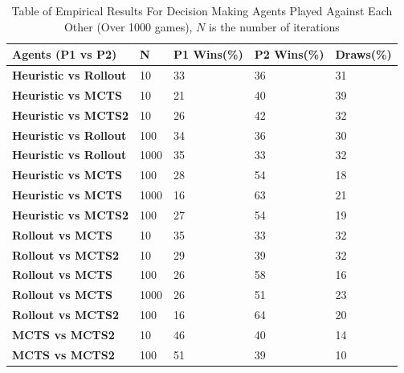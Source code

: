 \documentclass[journal]{IEEEtran}
\begin{document}
\begin{table}[H]
\centering
\caption{Table of Empirical Results For Decision Making Agents Played Against Each Other (Over 1000 games), $N$ is the number of iterations}
\label{results-table-ai}
\begin{tabular}{|l|l|l|l|l|}
\hline
\textbf{Agents (P1 vs P2)}    & \textbf{N} & \textbf{P1 Wins(\%)} & \textbf{P2 Wins(\%)} & \textbf{Draws(\%)} \\ \hline
\textbf{Heuristic vs Rollout} & 10                      & 33                    & 36                    & 31               \\ \hline
\textbf{Heuristic vs MCTS}    & 10                      & 21                    & 40                    & 39               \\ \hline
\textbf{Heuristic vs MCTS2}   & 10                      & 26                    & 42                    & 32               \\ \hline
\textbf{Heuristic vs Rollout} & 100                     & 34                    & 36                    & 30               \\ \hline
\textbf{Heuristic vs Rollout} & 1000                    & 35                    & 33                    & 32              \\ \hline
\textbf{Heuristic vs MCTS}    & 100                     & 28                    & 54                    & 18               \\ \hline
\textbf{Heuristic vs MCTS}    & 1000                    & 16                    & 63                    & 21               \\ \hline
\textbf{Heuristic vs MCTS2}   & 100                     & 27                    & 54                    & 19               \\ \hline
\textbf{Rollout vs MCTS}      & 10                      & 35                    & 33                    & 32               \\ \hline
\textbf{Rollout vs MCTS2}     & 10                      & 29                    & 39                    & 32               \\ \hline
\textbf{Rollout vs MCTS}      & 100                     & 26                    & 58                    & 16               \\ \hline
\textbf{Rollout vs MCTS}      & 1000                    & 26                    & 51                    & 23               \\ \hline
\textbf{Rollout vs MCTS2}     & 100                     & 16                    & 64                    & 20               \\ \hline
\textbf{MCTS vs MCTS2}        & 10                      & 46                    & 40                    & 14               \\ \hline
\textbf{MCTS vs MCTS2}        & 100                     & 51                    & 39                    & 10               \\ \hline
\end{tabular}
\end{table}
\end{document}
